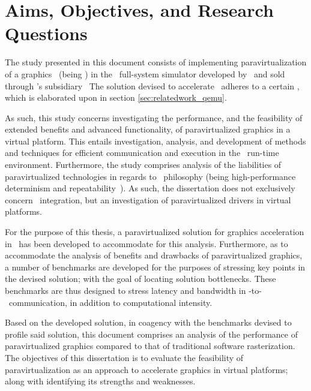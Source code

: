 
\chapter{Aims, Objectives, and Research Questions}
\label{cha:aimsandobjectives}
The study presented in this document consists of implementing paravirtualization of a graphics \dvttermapi\ (being \dvttermopenglestwopointo ) in the \dvttermsimics\ full-system simulator developed by \dvttermintel\ and sold through \dvttermintel 's subsidiary \dvttermwindriver\ 
The solution devised to accelerate \dvttermopengl\ adheres to a certain \dvttermreferencesolution , which is elaborated upon in section \ref{sec:relatedwork_qemu}.

As such, this study concerns investigating the performance, and the feasibility of extended benefits and advanced functionality, of paravirtualized graphics in a virtual platform.
This entails investigation, analysis, and development of methods and techniques for efficient communication and execution in the \dvttermsimics\ run-time environment.
Furthermore, the study comprises analysis of the liabilities of paravirtualized technologies in regards to \dvttermsimics\ philosophy (being high-performance determinism and repeatability~).
As such, the dissertation does not exclusively concern \dvttermsimics\ integration, but an investigation of paravirtualized drivers in virtual platforms.

For the purpose of this thesis, a paravirtualized solution for graphics acceleration in \dvttermsimics\ has been developed to accommodate for this analysis.
Furthermore, as to accommodate the analysis of benefits and drawbacks of paravirtualized graphics, a number of benchmarks are developed for the purposes of stressing key points in the devised solution; with the goal of locating solution bottlenecks.
These benchmarks are thus designed to stress latency and bandwidth in \dvttermtarget -to-\dvttermhost\ communication, in addition to computational intensity.

Based on the developed solution, in coagency with the benchmarks devised to profile said solution, this document comprises an analysis of the performance of paravirtualized graphics compared to that of traditional software rasterization.
The objectives of this dissertation is to evaluate the feasibility of paravirtualization as an approach to accelerate graphics in virtual platforms; along with identifying its strengths and weaknesses.

